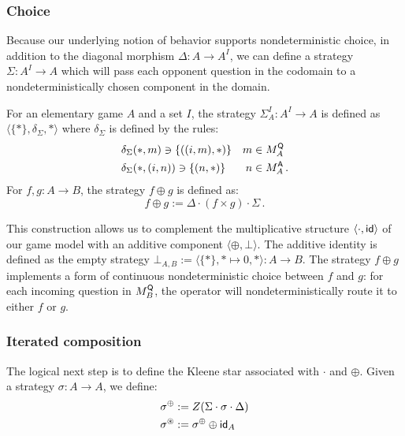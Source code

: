 
\subsubsection{Choice} %

Because our underlying notion of behavior supports
nondeterministic choice,
in addition to the diagonal morphism
$\Delta : A \rightarrow A^I$,
we can define a strategy
$\Sigma : A^I \rightarrow A$
which will pass each opponent question in the codomain
to a nondeterministically chosen component in the domain.

\begin{definition}
For an elementary game $A$ and a set $I$,
the strategy $\Sigma_A^I : A^I \rightarrow A$
is defined as $\langle \{*\}, \delta_\Sigma, * \rangle$
where $\delta_\Sigma$ is defined by the rules:
\begin{align*}
  &\delta_\Sigma(*, m) \ni \{((i, m), *)\} & m &\in M_A^{ \mathsf{Q} } \\
  &\delta_\Sigma(*, (i, n)) \ni \{(n, *)\} & n &\in M_A^{ \mathsf{A} } \,.
\end{align*}
For $f, g : A \rightarrow B$,
the strategy $f \oplus g$ is defined as:
\[ f \oplus g := \Delta \cdot (f \times g) \cdot \Sigma \,. \]
\end{definition}

This construction allows us to complement
the multiplicative structure $\langle \cdot,  \mathsf{id}  \rangle$
of our game model
with an additive component $\langle \oplus, \bot \rangle$.
The additive identity is defined as the empty strategy
$\bot_{A,B} := \langle \{*\}, * \mapsto 0, * \rangle : A \rightarrow B$.
The strategy $f \oplus g$
implements a form of continuous nondeterministic choice between $f$ and $g$:
for each incoming question in $M_B^{ \mathsf{Q} }$,
the operator will nondeterministically route it to either $f$ or $g$.


\subsubsection{Iterated composition}

The logical next step is to define the Kleene star
associated with $\cdot$ and $\oplus$.
Given a strategy $\sigma : A \rightarrow A$,
we define:
\begin{align*}
  \sigma^{\oplus} &:= Z(\Sigma \cdot \sigma \cdot \Delta) \\
  \sigma^{\oast} &:= \sigma^{\oplus} \oplus  \mathsf{id} _A
\end{align*}

